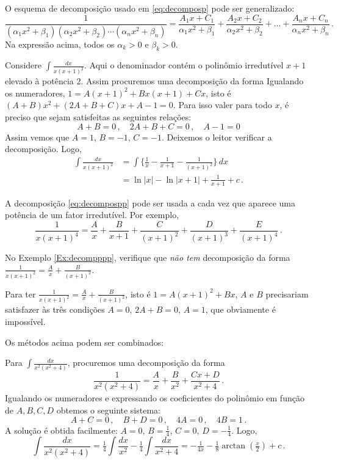 \begin{obs}
O esquema de decomposição usado em 
\eqref{eq:decomposp} pode ser generalizado:
$$
\frac{1}{(\alpha_1x^2+\beta_1)(\alpha_2x^2+\beta_2)\cdots
(\alpha_nx^2+\beta_n)}=\frac{A_1x+C_1}{\alpha_1x^2+\beta_1}+
\frac{A_2x+C_2}{\alpha_2 x^2+\beta_2}+\dots
+\frac{A_nx+C_n}{\alpha_n x^2+\beta_n}\,.
$$
Na expressão acima, todos os $\alpha_k>0$ e $\beta_k>0$.
\end{obs}

\begin{ex}\label{Ex:decompppp}
Considere $\int\frac{dx}{x(x+1)^2}$. Aqui o denominador contém o polinômio
irredutível $x+1$ elevado à potência $2$. Assim procuremos uma decomposição da
forma 
Igualando os numeradores, $1=A(x+1)^2+Bx(x+1)+Cx$, isto é
$(A+B)x^2+(2A+B+C)x+A-1=0$. Para isso valer para todo $x$, é preciso que sejam
satisfeitas as seguintes relações:
$$
A+B=0\,,\quad 2A+B+C=0\,,\quad A-1=0
$$
Assim vemos que $A=1$, $B=-1$, $C=-1$. Deixemos o leitor verificar a
decomposição.
Logo,
\begin{align*}
 \int\frac{dx}{x(x+1)^2}&=\int\Big\{\frac1x-\frac{1}{x+1}-\frac{1}{(x+1)^2}\}\,
dx\\
&=\ln|x|-\ln|x+1|+\frac{1}{x+1}+c\,.
\end{align*}
\end{ex}
\begin{obs}
A decomposição \eqref{eq:decompospp} pode ser usada a cada vez que aparece uma
potência de um fator irredutível. Por exemplo,
$$
\frac{1}{x(x+1)^4}=\frac{A}{x}+\frac{B}{x+1}+\frac{C}{(x+1)^2}+\frac{D}{(x+1)^3}
+\frac{E}{(x+1)^4}\,.
$$
\end{obs}

\begin{exo}
No Exemplo \ref{Ex:decompppp}, verifique que \emph{não tem} decomposição da
forma 
$\frac{1}{x(x+1)^2}=\frac{A}{x}+\frac{B}{(x+1)^2}$.
\begin{sol}
Para ter $\frac{1}{x(x+1)^2}=\frac{A}{x}+\frac{B}{(x+1)^2}$, isto é
$1=A(x+1)^2+Bx$, $A$ e $B$ precisariam satisfazer às três condições $A=0$,
$2A+B=0$, $A=1$, que obviamente é impossível.
\end{sol}
\end{exo}

Os métodos acima podem ser combinados:

\begin{ex}
Para $\int \frac{dx}{x^2(x^2+4)}$, procuremos uma decomposição da
forma
$$
\frac{1}{x^2(x^2+4)}=\frac{A}{x}+\frac{B}{x^2}+\frac{Cx+D}{x^2+4}\,.
$$
Igualando os numeradores e expressando os coeficientes do polinômio em função
de $A,B,C,D$ obtemos o seguinte sistema:
$$
A+C=0\,,\quad B+D=0\,,\quad 4A=0\,,\quad 4B=1\,.
$$
A solução é obtida facilmente: $A=0$, $B=\frac14$, $C=0$, $D=-\frac14$.
Logo,
$$\int \frac{dx}{x^2(x^2+4)}=
\tfrac14\int\frac{dx}{x^2}-\tfrac14\int\frac{dx}{x^2+4}=-\tfrac{1}{4x}
-\tfrac18\arctan(\tfrac{x}{2})+c\,.
$$
\end{ex}

